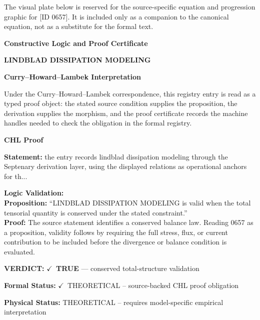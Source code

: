\begingroup\footnotesize\sloppy
The visual plate below is reserved for the source-specific equation and progression graphic for [ID 0657]. It is included only as a companion to the canonical equation, not as a substitute for the formal text.
\par\endgroup
\ifTZPDarkEdition
{}
\fi

\clearpage
\begingroup\tzpsupportsetup
\noindent\textbf{\fontsize{10.8pt}{12.8pt}\selectfont [ID 0657] Constructive Logic and Proof Certificate}\par
\noindent\textbf{\fontsize{10pt}{12pt}\selectfont LINDBLAD DISSIPATION MODELING}\par
\vspace{0.45em}
\begingroup
\footnotesize
\setlength{\parskip}{0.22em}
\setlength{\parindent}{0pt}
\noindent\textbf{Curry--Howard--Lambek Interpretation}\par
Under the Curry--Howard--Lambek correspondence, this registry entry is read as a typed proof
object: the stated source condition supplies the proposition, the derivation supplies the
morphism, and the proof certificate records the machine handles needed to check the obligation
in the formal registry.

\vspace{0.45em}
\noindent\textbf{CHL Proof}\par
\textbf{Statement:} the entry records lindblad dissipation modeling through the Septenary derivation layer,
using the displayed relations as operational anchors for th...

\textbf{Logic Validation:}\\
\textbf{Proposition:} ``LINDBLAD DISSIPATION MODELING is valid when the total tensorial quantity is conserved
under the stated constraint.''\\
\textbf{Proof:} The source statement identifies a conserved balance law. Reading 0657 as a proposition,
validity follows by requiring the full stress, flux, or current contribution to be
included before the divergence or balance condition is evaluated.

\textbf{VERDICT:} \ensuremath{\checkmark}\ \textbf{TRUE} --- conserved total-structure validation

\textbf{Formal Status:} \ensuremath{\checkmark}\ THEORETICAL -- source-backed CHL proof obligation

\textbf{Physical Status:} THEORETICAL -- requires model-specific empirical interpretation
\par\vspace{0.45em}
\par
\ifTZPDarkEdition
{}
\fi
\endgroup
\endgroup
